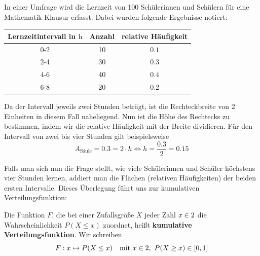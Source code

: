 \documentclass[ngerman, 12pt]{nssheetxea}
\begin{document}
\begin{example}
In einer Umfrage wird die Lernzeit von 100 Schülerinnen und Schülern für eine Mathematik-Klausur erfasst. Dabei wurden folgende Ergebnisse notiert:
\begin{center}
\begin{tabular}{c c c}
\toprule
Lernzeitintervall in $\unit{\hour}$ & Anzahl & relative Häufigkeit \\
\midrule
0-2 & 10 & $\num{0,1}$ \\
2-4 & 30 & $\num{0,3}$ \\
4-6 & 40 & $\num{0,4}$ \\
6-8 & 20 & $\num{0,2}$ \\
\bottomrule
\end{tabular}
\end{center}
Da der Intervall jeweils zwei Stunden beträgt, ist die Rechteckbreite von 2 Einheiten in diesem Fall naheliegend. Nun ist die Höhe des Rechtecks zu bestimmen, indem wir die relative Häufigkeit mit der Breite dividieren. Für den Intervall von zwei bis vier Stunden gilt beispielsweise
\[ A_{\mathrm{Säule}}=\num{0,3} = 2 \cdot h \Leftrightarrow h = \dfrac{\num{0,3}}{2} = \num{0,15}\]
\begin{center}

\end{center}
\label{Bsp:Histogramm}
\end{example}

Falls man sich nun die Frage stellt, wie viele Schülerinnen und Schüler höchstens vier Stunden lernen, addiert man die Flächen (relativen Häufigkeiten) der beiden ersten Intervalle. Dieses Überlegung führt uns zur kumulativen Verteilungsfunktion:

\begin{definition}
Die Funktion $F$, die bei einer Zufallsgröße $X$ jeder Zahl $x\in 2$ die Wahrscheinlichkeit $P(X\leq x)$ zuordnet, heißt \textbf{kumulative Verteilungsfunktion}. Wir schreiben
\[ F: x \mapsto P(X\leq x) \quad \text{mit} \ x\in2, \ P(X\geq x)\in [0,1]\]
\end{definition}
\end{document}
